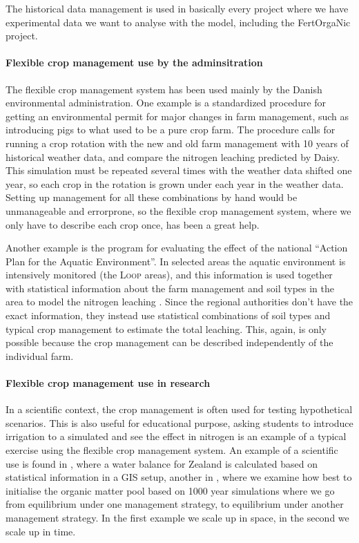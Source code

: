 \documentclass[a4paper]{article}
\begin{document}
The historical data management is used in basically every project
where we have experimental data we want to analyse with the model,
including the FertOrgaNic project.

\paragraph{Flexible crop management use by the adminsitration} The
flexible crop management system has been used mainly by the Danish
environmental administration.  One example is a standardized procedure
\cite{daisy-staabi} for getting an environmental permit for major
changes in farm management, such as introducing pigs to what used to
be a pure crop farm.  The procedure calls for running a crop rotation
with the new and old farm management with 10 years of historical
weather data, and compare the nitrogen leaching predicted by Daisy.
This simulation must be repeated several times with the weather data
shifted one year, so each crop in the rotation is grown under each
year in the weather data.  Setting up management for all these
combinations by hand would be unmanageable and errorprone, so the
flexible crop management system, where we only have to describe each
crop once, has been a great help.

Another example is the program for evaluating the effect of the
national ``Action Plan for the Aquatic Environment''.  In selected
areas the aquatic environment is intensively monitored (the
\textsc{Loop} areas), and this information is used together with
statistical information about the farm management and soil types in
the area to model the nitrogen leaching \cite{novana}.  Since the
regional authorities don't have the exact information, they instead
use statistical combinations of soil types and typical crop management
to estimate the total leaching.  This, again, is only possible because
the crop management can be described independently of the individual
farm.

\paragraph{Flexible crop management use in research} In a scientific
context, the crop management is often used for testing hypothetical
scenarios.  This is also useful for educational purpose, asking
students to introduce irrigation to a simulated and see the effect in
nitrogen is an example of a typical exercise using the flexible crop
management system.  An example of a scientific use is found in
\cite{boegh04a}, where a water balance for Zealand is calculated based
on statistical information in a GIS setup, another in \cite{org-init},
where we examine how best to initialise the organic matter pool based
on 1000 year simulations where we go from equilibrium under one
management strategy, to equilibrium under another management strategy.
In the first example we scale up in space, in the second we scale up
in time.
\end{document}
